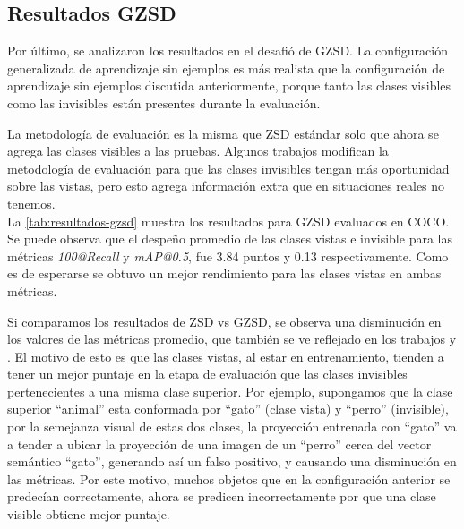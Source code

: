 \subsection{Resultados GZSD}
Por último, se analizaron los resultados en el desafió de GZSD. La configuración generalizada de aprendizaje sin ejemplos es más realista que la configuración de aprendizaje sin ejemplos discutida anteriormente, porque tanto las clases visibles como las invisibles están presentes durante la evaluación.

La metodología de evaluación es la misma que ZSD estándar solo que ahora se agrega las clases visibles a las pruebas. Algunos trabajos modifican la metodología de evaluación para que las clases invisibles tengan más oportunidad sobre las vistas, pero esto agrega información extra que en situaciones reales no tenemos.\\

La \autoref{tab:resultados-gzsd} muestra los resultados para GZSD evaluados en COCO. Se puede observa que el despeño promedio de las clases vistas e invisible para las métricas \textit{100@Recall} y \textit{mAP@0.5}, fue 3.84 puntos y 0.13 respectivamente. Como es de esperarse se obtuvo un mejor rendimiento para las clases vistas en ambas métricas.

Si comparamos los resultados de ZSD vs GZSD, se observa una disminución en los valores de las métricas promedio, que también se ve reflejado en los trabajos \cite{bansal2018zero} y \cite{rahman2020zero}. El motivo de esto es que las clases vistas, al estar en entrenamiento, tienden a tener un mejor puntaje en la etapa de evaluación que las clases invisibles pertenecientes a una misma clase superior. Por ejemplo, supongamos que la clase superior ``animal'' esta conformada por ``gato'' (clase vista) y ``perro'' (invisible), por la semejanza visual de estas dos clases, la proyección entrenada con ``gato'' va a tender a ubicar la proyección de una imagen de un ``perro'' cerca del vector semántico ``gato'', generando así un falso positivo, y causando una disminución en las métricas. Por este motivo, muchos objetos que en la configuración anterior se predecían correctamente, ahora se predicen incorrectamente por que una clase visible obtiene mejor puntaje.\\


